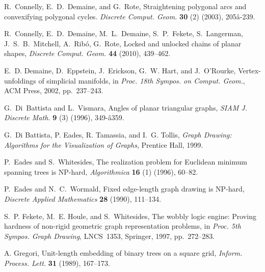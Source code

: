 \documentclass[runningheads]{article}
\begin{document}
\begin{thebibliography}{99}
R.~Connelly, E.~D.~Demaine, and G.~Rote,
Straightening polygonal arcs and convexifying polygonal cycles.
\emph{Discrete Comput. Geom.} {\bf 30} (2) (2003), 205â-239.

R.~Connelly, E.~D.~Demaine, M.~L.~Demaine, S.~P.~Fekete, S.~Langerman,
J.~S.~B.~Mitchell, A.~Rib\'o, G.~Rote,
Locked and unlocked chains of planar shapes,
\emph{Discrete Comput. Geom.} {\bf 44} %
(2010), 439--462.


E.~D. Demaine, D.~Eppstein, J.~Erickson, G.~W. Hart, and J.~O'Rourke,
Vertex-unfoldings of simplicial manifolds,
in \emph{Proc. 18th Sympos. on Comput. Geom.}, ACM Press, 2002, pp.~237--243.


G.~Di~Battista and L.~Vismara, Angles of planar triangular graphs,
\emph{SIAM J. Discrete Math.} {\bf 9} (3) (1996), 349-â359.

G.~Di Battista, P. Eades, R. Tamassia, and I.~G. Tollis,
\emph{Graph Drawing: Algorithms for the Visualization of Graphs},
Prentice Hall, 1999.

P.~Eades and S.~Whitesides,
The realization problem for Euclidean minimum spanning trees is NP-hard,
\emph{Algorithmica} {\bf 16} (1) (1996), 60--82.

P.~Eades and N.~C.~Wormald, Fixed edge-length graph drawing is NP-hard,
\emph{Discrete Applied Mathematics} {\bf 28} (1990), 111--134.

S.~P. Fekete, M.~E. Houle, and S.~Whitesides,
The wobbly logic engine: Proving hardness of non-rigid geometric graph representation problems,
in \emph{Proc. 5th Sympos. Graph Drawing}, LNCS~1353, Springer, 1997, pp.~272--283.

A. Gregori,
Unit-length embedding of binary trees on a square grid,
\emph{Inform. Process. Lett.} {\bf 31} (1989), 167--173.


\end{thebibliography}
\end{document}
